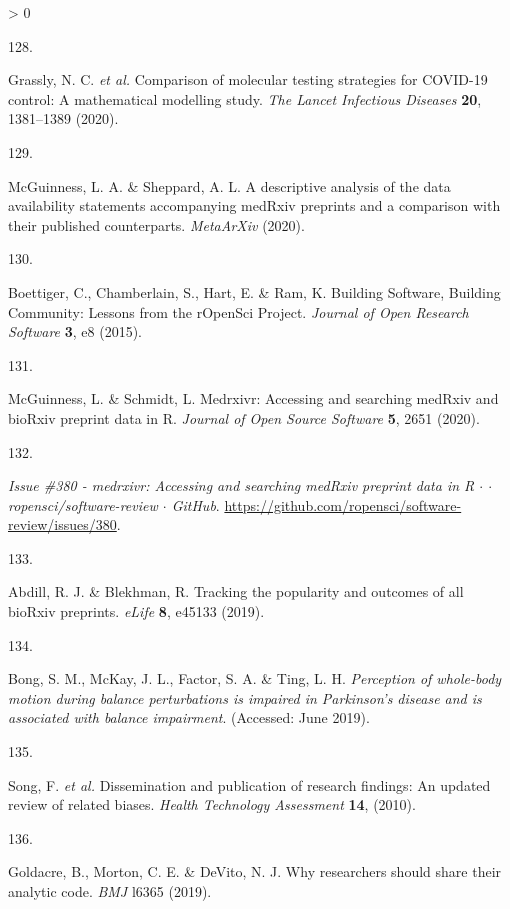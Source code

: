 \documentclass[a4paper, twoside]{templates/ociamthesis}
\newlength{\cslhangindent}
\newlength{\csllabelwidth}
\newenvironment{CSLReferences}[3] %
 {%
  \setlength{\parindent}{0pt}
  \ifodd #1 \everypar{\setlength{\hangindent}{\cslhangindent}}\ignorespaces\fi
  \ifnum #2 > 0
  \setlength{\parskip}{#2\baselineskip}
  \fi
 }%
 {}
\newcommand{\CSLLeftMargin}[1]{\parbox[t]{\maxof{\widthof{#1}}{\csllabelwidth}}{#1}}
\newcommand{\CSLRightInline}[1]{\parbox[t]{\linewidth - \csllabelwidth}{#1}}
\begin{document}
\begin{CSLReferences}{0}{0}
\leavevmode\hypertarget{ref-grassly2020}{}%
\CSLLeftMargin{128. }
\CSLRightInline{Grassly, N. C. \emph{et al.} Comparison of molecular testing strategies for {COVID}-19 control: A mathematical modelling study. \emph{The Lancet Infectious Diseases} \textbf{20}, 1381--1389 (2020).}

\leavevmode\hypertarget{ref-mcguinness2020DAScomparison}{}%
\CSLLeftMargin{129. }
\CSLRightInline{McGuinness, L. A. \& Sheppard, A. L. A descriptive analysis of the data availability statements accompanying {medRxiv} preprints and a comparison with their published counterparts. \emph{MetaArXiv} (2020).}

\leavevmode\hypertarget{ref-boettiger2015}{}%
\CSLLeftMargin{130. }
\CSLRightInline{Boettiger, C., Chamberlain, S., Hart, E. \& Ram, K. Building {Software}, {Building Community}: Lessons from the {rOpenSci Project}. \emph{Journal of Open Research Software} \textbf{3}, e8 (2015).}

\leavevmode\hypertarget{ref-mcguinness2020medrxivr}{}%
\CSLLeftMargin{131. }
\CSLRightInline{McGuinness, L. \& Schmidt, L. Medrxivr: Accessing and searching {medRxiv} and {bioRxiv} preprint data in {R}. \emph{Journal of Open Source Software} \textbf{5}, 2651 (2020).}

\leavevmode\hypertarget{ref-zotero-15016}{}%
\CSLLeftMargin{132. }
\CSLRightInline{\emph{Issue \#380 - medrxivr: Accessing and searching {medRxiv} preprint data in {R} {\(\cdot\)} {\(\cdot\)} ropensci/software-review {\(\cdot\)} {GitHub}}. \url{https://github.com/ropensci/software-review/issues/380}.}

\leavevmode\hypertarget{ref-abdill2019popularity}{}%
\CSLLeftMargin{133. }
\CSLRightInline{Abdill, R. J. \& Blekhman, R. Tracking the popularity and outcomes of all {bioRxiv} preprints. \emph{eLife} \textbf{8}, e45133 (2019).}

\leavevmode\hypertarget{ref-bong2019}{}%
\CSLLeftMargin{134. }
\CSLRightInline{Bong, S. M., McKay, J. L., Factor, S. A. \& Ting, L. H. \emph{Perception of whole-body motion during balance perturbations is impaired in {Parkinson}'s disease and is associated with balance impairment}. (Accessed: June 2019).}

\leavevmode\hypertarget{ref-song2010}{}%
\CSLLeftMargin{135. }
\CSLRightInline{Song, F. \emph{et al.} Dissemination and publication of research findings: An updated review of related biases. \emph{Health Technology Assessment} \textbf{14}, (2010).}

\leavevmode\hypertarget{ref-goldacre2019}{}%
\CSLLeftMargin{136. }
\CSLRightInline{Goldacre, B., Morton, C. E. \& DeVito, N. J. Why researchers should share their analytic code. \emph{BMJ} l6365 (2019).}


\end{CSLReferences}
\end{document}
